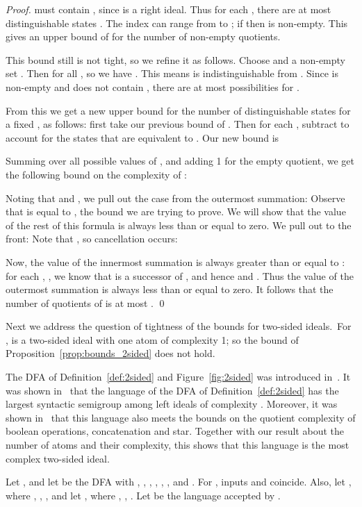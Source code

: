 \documentclass{llncs}
\begin{document}
\begin{proof}
 must contain , since  is a right ideal. Thus for each , there are at most  distinguishable states .
The index  can range from  to ; if  then  is non-empty.
This gives an upper bound of  for the number of non-empty quotients. 

This bound still is not tight, so we refine it as follows.
Choose  and a non-empty set . 
Then  for all , so we have
.
This means  is indistinguishable from .
Since  is non-empty and does not contain , there are at most  possibilities for .

From this we get a new upper bound for the number of distinguishable states  for a fixed , as follows: first take our previous bound of . Then for each ,   subtract  to account for the states  that are equivalent to . Our new bound is
 
Summing over all possible values of , and adding 1 for the empty quotient, we get the following bound on the complexity of :
 
Noting that  and , we pull out the  case from the outermost summation:
{\small
}
Observe that  is equal to , the bound we are trying to prove. We will show that the  value of the  rest of this formula is always less than or equal to zero. We pull 
 out to the front:
{\small
}
Note that  
, so cancellation occurs:

Now, the value of the innermost summation is always greater than or equal to : for each , , we  know  that  is a successor of , and hence  and . Thus the value of the outermost summation is always less than or equal to zero.
It follows that the number of quotients of  is at most .
\qed
\end{proof}

Next we address the question of tightness of the bounds for two-sided ideals.\
For ,  is a two-sided ideal with one atom of complexity 1; so the bound of Proposition~\ref{prop:bounds_2sided} does not hold. 

The DFA of  Definition~\ref{def:2sided} and Figure~\ref{fig:2sided} was introduced in~\cite{BrYe11}.
It was shown in~\cite{BrSz14} that the language of the DFA of  Definition~\ref{def:2sided} has the largest syntactic semigroup among left ideals of complexity .
 Moreover, it was shown in~\cite{BrLiu15} that this language also meets the bounds on the quotient complexity of boolean operations, concatenation and star. Together with our result about the number of atoms and their complexity, this shows that this language is the most complex two-sided ideal.

\begin{definition}
\label{def:2sided}
Let , and let  
 be the DFA with
 ,
,
,
,
,
,
and .
For ,  inputs  and  coincide.
Also, let , where
,
,
 ,
and 
let , where 
,
,
. 
Let  be the language accepted by .
\end{definition}
\end{document}

